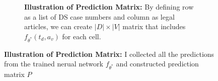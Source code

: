 \begin{figure}[!tbp]
\begin{subfigure}[b]{0.49\textwidth}
{\begin{tikzpicture}
      \end{tikzpicture}
    }
    \label{fig:illutrate-preds}
    \caption{\textbf{Illustration of Prediction Matrix:} By defining row as a list of DS case numbers and column as legal articles, we can create $|D| \times |V|$ matrix that includes $f_{\theta^*}(t_d, a_v)$ for each cell.}
  \end{subfigure}
  \hfill
  \begin{subfigure}[b]{0.49\textwidth}
  \end{subfigure}
  \caption{\textbf{Illustration of Prediction Matrix:} I collected all the predictions from the trained nerual network $f_{\theta^*}$ and constructed prediction matrix $P$}
  \label{fig:illutrate-preds}
\end{figure}
